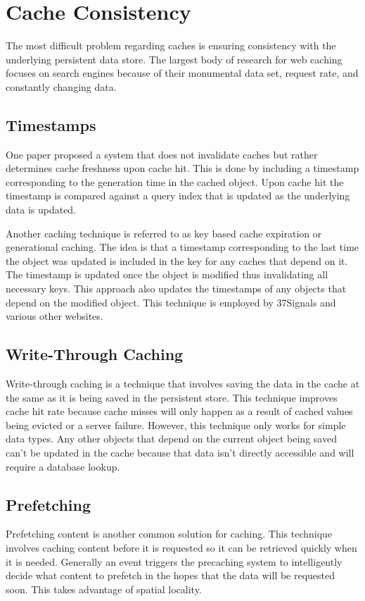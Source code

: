 \documentclass[12pt]{article}
\begin{document}
\section{Cache Consistency}
The most difficult problem regarding caches is ensuring consistency with the underlying persistent data store.
The largest body of research for web caching focuses on search engines because of their monumental data set, request rate, and constantly changing data.

\subsection{Timestamps}
One paper proposed a system that does not invalidate caches but rather determines cache freshness upon cache hit.\cite{cacheInvalidationWebSearch}
This is done by including a timestamp corresponding to the generation time in the cached object.
Upon cache hit the timestamp is compared against a query index that is updated as the underlying data is updated.

Another caching technique is referred to as key based cache expiration\cite{keyBasedCacheExpiration} or generational caching\cite{generationalCaching}.
The idea is that a timestamp corresponding to the last time the object was updated is included in the key for any caches that depend on it.
The timestamp is updated once the object is modified thus invalidating all necessary keys.
This approach also updates the timestamps of any objects that depend on the modified object.
This technique is employed by 37Signals and various other websites.\cite{keyBasedCacheExpiration}

\subsection{Write-Through Caching}
Write-through caching is a technique that involves saving the data in the cache at the same as it is being saved in the persistent store.\cite{writeThroughCaching}
This technique improves cache hit rate because cache misses will only happen as a result of cached values being evicted or a server failure.
However, this technique only works for simple data types.
Any other objects that depend on the current object being saved can't be updated in the cache because that data isn't directly accessible and will require a database lookup.

\subsection{Prefetching}
Prefetching content is another common solution for caching.
This technique involves caching content before it is requested so it can be retrieved quickly when it is needed.
Generally an event triggers the precaching system to intelligently decide what content to prefetch in the hopes that the data will be requested soon.
This takes advantage of spatial locality.
\end{document}
